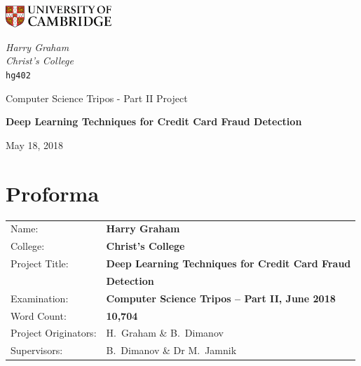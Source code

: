 \documentclass[12pt,a4paper,twoside]{report}
\begin{document}
\begin{titlepage}
	\noindent
	\begin{minipage}[t][][t]{0.5\textwidth}
		\includegraphics[width=40mm]{CamLogo.jpg}
	\end{minipage}
	\begin{minipage}{0.5\textwidth}
	\begin{flushright}
		\large
		\textit{Harry Graham}
		\\
		\textit{Christ's College}
		\\
		\texttt{hg402}
	\end{flushright}
	\end{minipage}
	
	\begin{center}
	\vspace{6cm}
	{\sc\large Computer Science Tripos - Part II Project\par}
	\vspace{0.5cm}
	{\huge\bf Deep Learning Techniques for Credit Card Fraud Detection\par}
	\vspace{0.5cm}
	{\large May 18, 2018 \par}
	\end{center}

\end{titlepage}

\pagestyle{plain}

\section*{\huge Proforma}
\vspace{0.5cm}
{\large
\begin{tabular}{ll}
Name:               & \bf Harry Graham \\
College:            & \bf Christ's College \\
Project Title:      & \bf Deep Learning Techniques for Credit Card Fraud \\
			 & \bf Detection \\
Examination:        & \bf Computer Science Tripos -- Part II, June 2018 \\
Word Count:         &  \bf 10,704 \\
Project Originators: & H.~Graham \& B.~Dimanov \\
Supervisors:         & B.~Dimanov \& Dr M.~Jamnik
\end{tabular}
}
\end{document}

